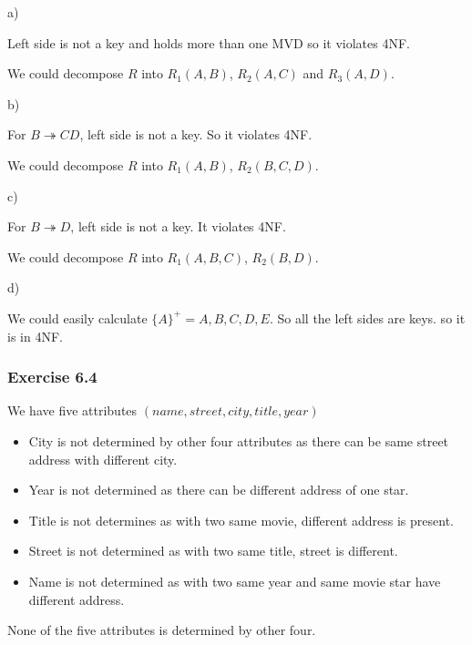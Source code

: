 \documentclass[../../main.tex]{subfiles}
\begin{document}
a)

Left side is not a key and holds more than one MVD
so it violates 4NF.

We could decompose $R$ into $R_{1}(A, B)$, $R_{2}(A, C)$
and $R_{3}(A, D)$.

b)

For $B \twoheadrightarrow CD$, left side is not a key. So it
violates 4NF.

We could decompose $R$ into $R_{1}(A, B)$, $R_{2}(B, C, D)$.

c)

For $B \twoheadrightarrow D$, left side is not a key. It violates
4NF.

We could decompose $R$ into $R_{1}(A, B, C)$, $R_{2}(B, D)$.

d)

We could easily calculate $\{A\}^{+} = {A, B, C, D, E}$. So
all the left sides are keys. so it is in 4NF.

\subsubsection*{Exercise 6.4}

We have five attributes $(name, street, city, title, year)$

\begin{itemize}
  \item City is not determined by other four attributes as there
        can be same street address with different city.
  \item Year is not determined as there can be different address
        of one star.
  \item Title is not determines as with two same movie, different
        address is present.
  \item Street is not determined as with two same title, street is different.
  \item Name is not determined as with two same year and same movie star have different address.
\end{itemize}

None of the five attributes is determined by other four.
\end{document}
